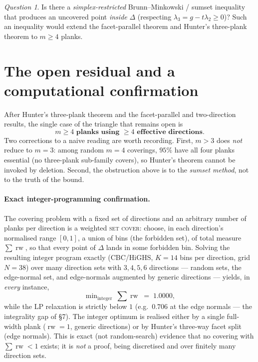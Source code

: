 \documentclass[11pt]{article}
\theoremstyle{plain}
\theoremstyle{remark}
\newtheorem{question}[theorem]{Question}
\newcommand{\rw}{\operatorname{rw}}
\begin{document}
\begin{question}
Is there a \emph{simplex-restricted} Brunn--Minkowski / sumset inequality that
produces an uncovered point \emph{inside} $\Delta$ (respecting
$\lambda_3=g-t\lambda_2\ge0$)? Such an inequality would extend the facet-parallel
theorem and Hunter's three-plank theorem to $m\ge4$ planks.
\end{question}

\section{The open residual and a computational confirmation}\label{sec:open}
After Hunter's three-plank theorem and the facet-parallel and two-direction
results, the single case of the triangle that remains open is
\[
   \textbf{$m\ge4$ planks using $\ge4$ effective directions.}
\]
Two corrections to a naive reading are worth recording. First, $m>3$ does
\emph{not} reduce to $m=3$: among random $m=4$ coverings, $95\%$ have all four
planks essential (no three-plank sub-family covers), so Hunter's theorem cannot be
invoked by deletion. Second, the obstruction above is to the \emph{sumset method},
not to the truth of the bound.

\paragraph{Exact integer-programming confirmation.}
The covering problem with a fixed set of directions and an arbitrary number of
planks per direction is a weighted \textsc{set cover}: choose, in each direction's
normalised range $[0,1]$, a union of bins (the forbidden set), of total measure
$\sum\rw$, so that every point of $\Delta$ lands in some forbidden bin. Solving the
resulting integer program exactly (CBC/HiGHS, $K=14$ bins per direction, grid
$N=38$) over many direction sets with $3,4,5,6$ directions --- random sets, the
edge-normal set, and edge-normals augmented by generic directions --- yields, in
\emph{every} instance,
\[
   \min\nolimits_{\text{integer}}\ \textstyle\sum\rw \;=\; 1.0000,
\]
while the LP relaxation is strictly below $1$ (e.g.\ $0.706$ at the edge normals ---
the integrality gap of \S7). The integer optimum is realised either by a single
full-width plank ($\rw=1$, generic directions) or by Hunter's three-way facet split
(edge normals). This is exact (not random-search) evidence that no covering with
$\sum\rw<1$ exists; it is \emph{not} a proof, being discretised and over finitely
many direction sets.
\end{document}
